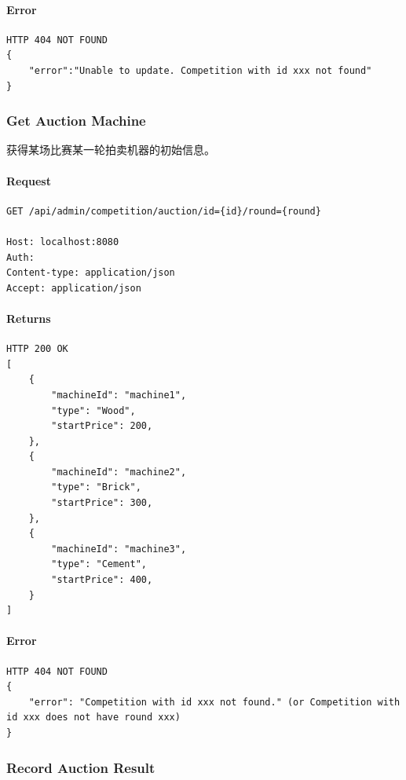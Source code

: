 \documentclass{article}
\begin{document}
\paragraph*{Error}
\begin{lstlisting}
HTTP 404 NOT FOUND
{
    "error":"Unable to update. Competition with id xxx not found"
}
\end{lstlisting}

\subsubsection{Get Auction Machine}

获得某场比赛某一轮拍卖机器的初始信息。

\paragraph*{Request}
\begin{lstlisting}
GET /api/admin/competition/auction/id={id}/round={round}

Host: localhost:8080
Auth:
Content-type: application/json
Accept: application/json
\end{lstlisting}

\paragraph*{Returns}
\begin{lstlisting}
HTTP 200 OK
[
    {
        "machineId": "machine1",
        "type": "Wood",
        "startPrice": 200,
    },
    {
        "machineId": "machine2",
        "type": "Brick",
        "startPrice": 300,
    },
    {
        "machineId": "machine3",
        "type": "Cement",
        "startPrice": 400,
    }
]
\end{lstlisting}

\paragraph*{Error}
\begin{lstlisting}
HTTP 404 NOT FOUND
{
    "error": "Competition with id xxx not found." (or Competition with id xxx does not have round xxx)
}
\end{lstlisting}

\subsubsection{Record Auction Result}
\end{document}
